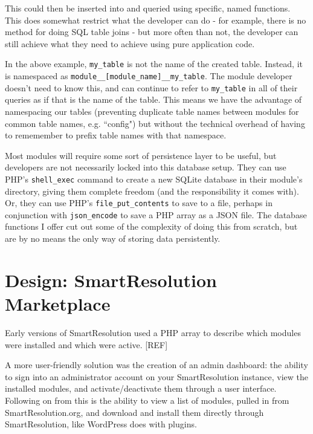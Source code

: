 This could then be inserted into and queried using specific, named functions. This does somewhat restrict what the developer can do - for example, there is no method for doing SQL table joins - but more often than not, the developer can still achieve what they need to achieve using pure application code.

In the above example, \lstinline{my_table} is not the name of the created table. Instead, it is namespaced as \lstinline{module__[module_name]__my_table}. The module developer doesn't need to know this, and can continue to refer to \lstinline{my_table} in all of their queries as if that is the name of the table. This means we have the advantage of namespacing our tables (preventing duplicate table names between modules for common table names, e.g. ``config") but without the technical overhead of having to rememember to prefix table names with that namespace.

Most modules will require some sort of persistence layer to be useful, but developers are not necessarily locked into this database setup. They can use PHP's \lstinline{shell_exec} command to create a new SQLite database in their module's directory, giving them complete freedom (and the responsibility it comes with). Or, they can use PHP's \lstinline{file_put_contents} to save to a file, perhaps in conjunction with \lstinline{json_encode} to save a PHP array as a JSON file. The database functions I offer cut out some of the complexity of doing this from scratch, but are by no means the only way of storing data persistently.

\section{Design: SmartResolution Marketplace}

Early versions of SmartResolution used a PHP array to describe which modules were installed and which were active. [REF] %

A more user-friendly solution was the creation of an admin dashboard: the ability to sign into an administrator account on your SmartResolution instance, view the installed modules, and activate/deactivate them through a user interface. Following on from this is the ability to view a list of modules, pulled in from SmartResolution.org, and download and install them directly through SmartResolution, like WordPress does with plugins.

